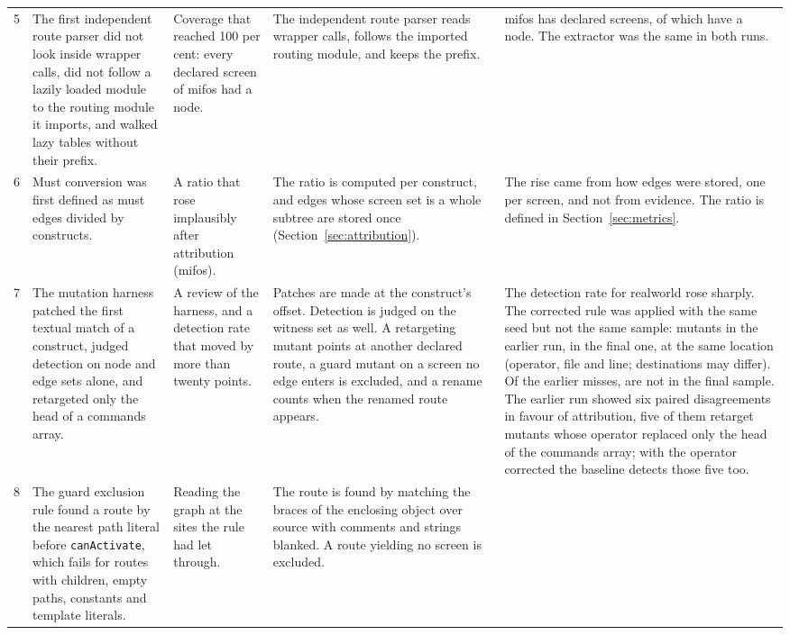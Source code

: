 \begin{xltabular}{\textwidth}{@{}rYYYY@{}}
5 & The first independent route parser did not look inside wrapper calls, did not follow a lazily loaded module to the routing module it imports, and walked lazy tables without their prefix.
  & Coverage that reached 100 per cent: every declared screen of mifos had a node.
  & The independent route parser reads wrapper calls, follows the imported routing module, and keeps the prefix.
  & mifos has \RoundTwoEarlierOracleMifosDeclared{} declared screens, of which \NodeAuditMatchedMifos{} have a node. The extractor was the same in both runs. \\
6 & Must conversion was first defined as must edges divided by constructs.
  & A ratio that rose implausibly after attribution (mifos).
  & The ratio is computed per construct, and edges whose screen set is a whole subtree are stored once (Section~\ref{sec:attribution}).
  & The rise came from how edges were stored, one per screen, and not from evidence. The ratio is defined in Section~\ref{sec:metrics}. \\
7 & The mutation harness patched the first textual match of a construct, judged detection on node and edge sets alone, and retargeted only the head of a commands array.
  & A review of the harness, and a detection rate that moved by more than twenty points.
  & Patches are made at the construct's offset. Detection is judged on the witness set as well. A retargeting mutant points at another declared route, a guard mutant on a screen no edge enters is excluded, and a rename counts when the renamed route appears.
  & The detection rate for realworld rose sharply. The corrected rule was applied with the same seed but not the same sample: \MutEarlierSampled{} mutants in the earlier run, \MutSampled{} in the final one, \MutOverlap{} at the same location (operator, file and line; destinations may differ). Of the \MutEarlierFailures{} earlier misses, \MutEarlierFailuresAbsent{} are not in the final sample. The earlier run showed six paired disagreements in favour of attribution, five of them retarget mutants whose operator replaced only the head of the commands array; with the operator corrected the baseline detects those five too. \\
8 & The guard exclusion rule found a route by the nearest path literal before \texttt{canActivate}, which fails for routes with children, empty paths, constants and template literals.
  & Reading the graph at the sites the rule had let through.
  & The route is found by matching the braces of the enclosing object over source with comments and strings blanked. A route yielding no screen is excluded.

\end{xltabular}
